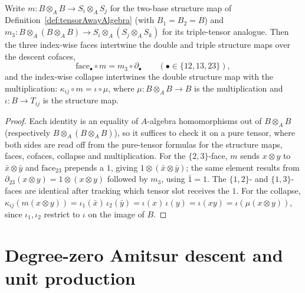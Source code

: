 \begin{lemma}
  \label{lem:faceA_comp_tensorMap}
  \leanok
  Write \(m \colon B \otimes_A B \to S_i \otimes_A S_j\) for the two-base structure map of
  Definition~\ref{def:tensorAwayAlgebra} (with \(B_1 = B_2 = B\)) and \(m_3 \colon
  B \otimes_A (B \otimes_A B) \to S_i \otimes_A (S_j \otimes_A S_k)\) for its triple-tensor
  analogue. Then the three index-wise faces intertwine the double and triple structure maps
  over the descent cofaces,
  \[
    \mathrm{face}_{\bullet} \circ m = m_3 \circ \partial_{\bullet}
    \qquad (\bullet \in \{12, 13, 23\}) ,
  \]
  and the index-wise collapse intertwines the double structure map with the multiplication:
  \(\kappa_{ij} \circ m = \iota \circ \mu\), where \(\mu \colon B \otimes_A B \to B\) is the
  multiplication and \(\iota \colon B \to T_{ij}\) is the structure map.
\end{lemma}
\begin{proof}
  \leanok
  Each identity is an equality of \(A\)-algebra homomorphisms out of \(B \otimes_A B\)
  (respectively \(B \otimes_A (B \otimes_A B)\)), so it suffices to check it on a pure tensor,
  where both sides are read off from the pure-tensor formulas for the structure maps, faces,
  cofaces, collapse and multiplication. For the \(\{2,3\}\)-face, \(m\) sends
  \(x \otimes y\) to \(\bar x \otimes \bar y\) and \(\mathrm{face}_{23}\) prepends a \(1\),
  giving \(1 \otimes (\bar x \otimes \bar y)\); the same element results from
  \(\partial_{23}(x \otimes y) = 1 \otimes (x \otimes y)\) followed by \(m_3\), using
  \(\bar 1 = 1\). The \(\{1,2\}\)- and \(\{1,3\}\)-faces are identical after tracking which
  tensor slot receives the \(1\). For the collapse, \(\kappa_{ij}(m(x \otimes y)) =
  \iota_1(\bar x)\,\iota_2(\bar y) = \iota(x)\,\iota(y) = \iota(xy) = \iota(\mu(x \otimes y))\),
  since \(\iota_1, \iota_2\) restrict to \(\iota\) on the image of \(B\).
\end{proof}

\section{Degree-zero Amitsur descent and unit production}
\label{sec:amitsurDescentAlgebra}

